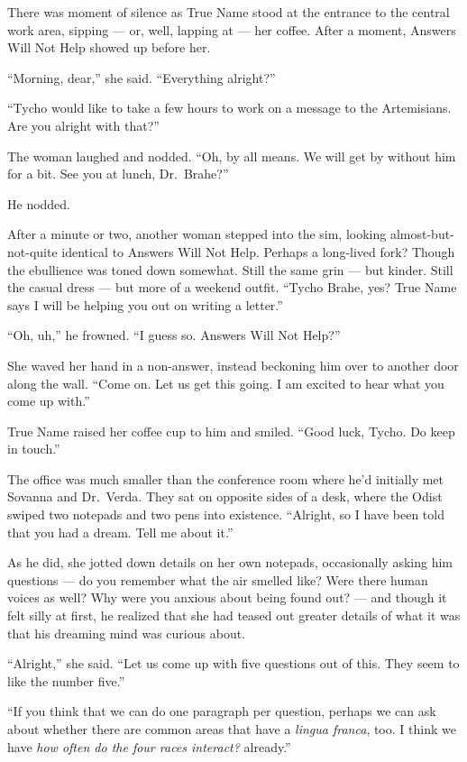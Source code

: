 There was moment of silence as True Name stood at the entrance to the central work area, sipping --- or, well, lapping at --- her coffee. After a moment, Answers Will Not Help showed up before her.

``Morning, dear,'' she said. ``Everything alright?''

``Tycho would like to take a few hours to work on a message to the Artemisians. Are you alright with that?''

The woman laughed and nodded. ``Oh, by all means. We will get by without him for a bit. See you at lunch, Dr.~Brahe?''

He nodded.

After a minute or two, another woman stepped into the sim, looking almost-but-not-quite identical to Answers Will Not Help. Perhaps a long-lived fork? Though the ebullience was toned down somewhat. Still the same grin — but kinder. Still the casual dress — but more of a weekend outfit. ``Tycho Brahe, yes? True Name says I will be helping you out on writing a letter.''

``Oh, uh,'' he frowned. ``I guess so. Answers Will Not Help?''

She waved her hand in a non-answer, instead beckoning him over to another door along the wall. ``Come on. Let us get this going. I am excited to hear what you come up with.''

True Name raised her coffee cup to him and smiled. ``Good luck, Tycho. Do keep in touch.''

The office was much smaller than the conference room where he'd initially met Sovanna and Dr.~Verda. They sat on opposite sides of a desk, where the Odist swiped two notepads and two pens into existence. ``Alright, so I have been told that you had a dream. Tell me about it.''

As he did, she jotted down details on her own notepads, occasionally asking him questions — do you remember what the air smelled like? Were there human voices as well? Why were you anxious about being found out? — and though it felt silly at first, he realized that she had teased out greater details of what it was that his dreaming mind was curious about.

``Alright,'' she said. ``Let us come up with five questions out of this. They seem to like the number five.''

``If you think that we can do one paragraph per question, perhaps we can ask about whether there are common areas that have a \emph{lingua franca}, too. I think we have \emph{how often do the four races interact?} already.''

